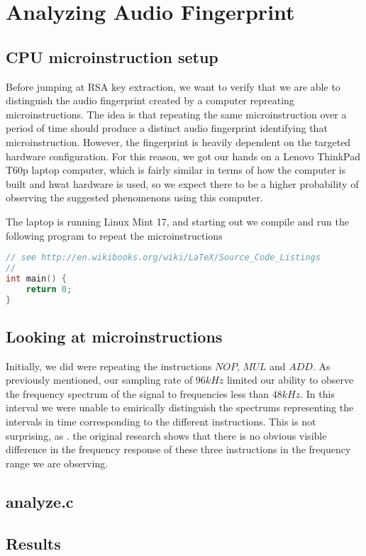 \chapter{Analyzing Audio Fingerprint}
\label{chp:analyzing} 

\section{CPU microinstruction setup}\label{sec:cpu_microinstruction_setup}
Before jumping at RSA key extraction, we want to verify that we are able to distinguish the audio fingerprint created by a computer repreating microinstructions. 
The idea is that repeating the same microinstruction over a period of time should produce a distinct audio fingerprint identifying that microinstruction. 
However, the fingerprint is heavily dependent on the targeted hardware configuration. 
For this reason, we got our hands on a Lenovo ThinkPad T60p laptop computer, which is fairly similar in terms of how the computer is built and hwat hardware is used, so we expect there to be a higher probability of observing the suggested phenomenons using this computer.

The laptop is running Linux Mint 17, and starting out we compile and run the following program to repeat the microinstructions 


\begin{lstlisting}[language=C]
// see http://en.wikibooks.org/wiki/LaTeX/Source_Code_Listings
// 
int main() {
	return 0;
}
\end{lstlisting}


\section{Looking at microinstructions}\label{sec:microinstructions}
Initially, we did were repeating the instructions \( NOP\), \( MUL\) and \( ADD\).
As previously mentioned, our sampling rate of \( 96kHz\) limited our ability to observe the frequency spectrum of the signal to frequencies less than \( 48kHz\).
In this interval we were unable to emirically distinguish the spectrums representing the intervals in time corresponding to the different instructions.
This is not surprising, as . the original research shows that there is no obvious visible difference in the frequency response of these three instructions in the frequency range we are observing.


\section{analyze.c}\label{sec:analyse}


\section{Results}\label{sec:results}
